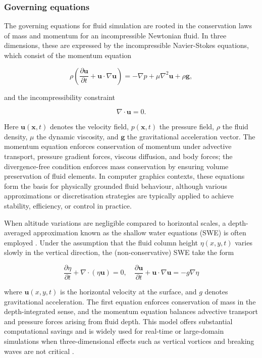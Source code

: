 \subsubsection{Governing equations}
The governing equations for fluid simulation are rooted in the conservation laws of mass and momentum for an incompressible Newtonian fluid. In three dimensions, these are expressed by the incompressible Navier-Stokes equations, which consist of the momentum equation

$$
\rho \left(\frac{\partial \mathbf{u}}{\partial t} + \mathbf{u}\cdot\nabla\mathbf{u}\right) = -\nabla p + \mu \nabla^2 \mathbf{u} + \rho \mathbf{g},
$$

and the incompressibility constraint

$$
\nabla\cdot\mathbf{u} = 0.
$$

Here $\mathbf{u}(\mathbf{x},t)$ denotes the velocity field, $p(\mathbf{x},t)$ the pressure field, $\rho$ the fluid density, $\mu$ the dynamic viscosity, and $\mathbf{g}$ the gravitational acceleration vector. The momentum equation enforces conservation of momentum under advective transport, pressure gradient forces, viscous diffusion, and body forces; the divergence-free condition enforces mass conservation by ensuring volume preservation of fluid elements. In computer graphics contexts, these equations form the basis for physically grounded fluid behaviour, although various approximations or discretisation strategies are typically applied to achieve stability, efficiency, or control in practice.

When altitude variations are negligible compared to horizontal scales, a depth-averaged approximation known as the shallow water equations (SWE) is often employed \cite{Parna2019}. Under the assumption that the fluid column height $\eta(x,y,t)$ varies slowly in the vertical direction, the (non-conservative) SWE take the form

$$
\frac{\partial \eta}{\partial t} + \nabla\cdot(\eta \mathbf{u}) = 0, 
\quad
\frac{\partial \mathbf{u}}{\partial t} + \mathbf{u} \cdot \nabla \mathbf{u} = - g \nabla \eta
$$

where $\mathbf{u}(x,y,t)$ is the horizontal velocity at the surface, and $g$ denotes gravitational acceleration. %
The first equation enforces conservation of mass in the depth-integrated sense, and the momentum equation balances advective transport and pressure forces arising from fluid depth. %
This model offers substantial computational savings and is widely used for real-time or large-domain simulations when three-dimensional effects such as vertical vortices and breaking waves are not critical \cite{Parna2019}. %

